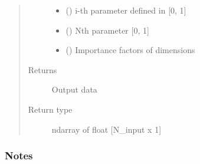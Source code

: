 \documentclass[letterpaper,10pt,english,openany,oneside]{sphinxmanual}
\begin{document}
\begin{fulllineitems}
\begin{quote}
\begin{description}
\begin{itemize}
\item {} 
\sphinxstyleliteralstrong{\sphinxupquote{{[}}}\sphinxstyleliteralstrong{\sphinxupquote{{]}}} (\sphinxstyleliteralemphasis{\sphinxupquote{ {[}}}\sphinxstyleliteralemphasis{\sphinxupquote{{]}}}) \textendash{} i-th parameter defined in {[}0, 1{]}

\item {} 
\sphinxstyleliteralstrong{\sphinxupquote{{[}}}\sphinxstyleliteralstrong{\sphinxupquote{{]}}} (\sphinxstyleliteralemphasis{\sphinxupquote{ {[}}}\sphinxstyleliteralemphasis{\sphinxupquote{{]}}}) \textendash{} Nth parameter {[}0, 1{]}

\item {} 
\sphinxstyleliteralstrong{\sphinxupquote{{[}}}\sphinxstyleliteralstrong{\sphinxupquote{{]}}} (\sphinxstyleliteralemphasis{\sphinxupquote{ {[}}}\sphinxstyleliteralemphasis{\sphinxupquote{{]}}}) \textendash{} Importance factors of dimensions

\end{itemize}

\item[{Returns}] \leavevmode
{} \textendash{} Output data

\item[{Return type}] \leavevmode
ndarray of float {[}N\_input x 1{]}

\end{description}\end{quote}
\subsubsection*{Notes}

\begin{figure}[htbp]
\centering


\end{figure}
\end{fulllineitems}
\end{document}
